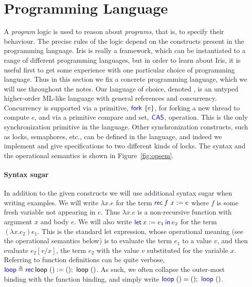 \section{Programming Language}
\label{sec:setup}

A \emph{program} logic is used to reason about \emph{programs}, that is, to specify their behaviour.
The precise rules of the logic depend on the constructs present in the
programming language.
Iris is really a framework, which can be instantiated to a range of
different programming languages, but in order to learn about Iris,
it is useful first to get some experience with one particular choice of
programming language.
Thus in this section we fix a concrete programming language, which we will use throughout the notes.
Our language of choice, denoted  \proglang,
is an untyped higher-order ML-like language with general references and
concurrency.
Concurrency is supported via a primitive, $\Fork{e}$, for forking a
new thread to compute $e$, and
via a primitive compare and set, $\textsf{\color{blue} CAS}$, operation.
This is the only synchronization primitive in the language.
Other synchronization constructs, such as locks, semaphores, etc., can be defined in the language, and indeed we implement and give specifications to two different kinds of locks.
The syntax and the operational semantics is shown in
Figure~\ref{fig:opsem}.

\paragraph*{Syntax sugar}
In addition to the given constructs we will use additional syntax sugar when writing examples.
We will write $\lambda x . e$ for the term $\Rec{f} x = e$ where $f$ is some fresh variable not appearing in $e$.
Thus $\lambda x . e$ is a non-recursive function with argument $x$ and body $e$.
We will also write $\Let x = e_1 in e_2$ for the term $(\lambda x . e_2) e_1$.
This is the standard let expression, whose operational meaning (see the operational semantics below) is to evaluate the term $e_1$ to a value $v$, and then evaluate $e_2[v/x]$, \ie{} the term $e_2$ with the value $v$ substituted for the variable $x$.
Referring to function definitions can be quite verbose, \eg\
$\langkw{loop} \mdef \Rec \textlang{loop} () = ();\ \textlang{loop}\ ()$.
As such, we often collapse the outer-most binding with the function binding,
and simply write $\langkw{loop}\ () = ();\ \langkw{loop}\ ()$.

